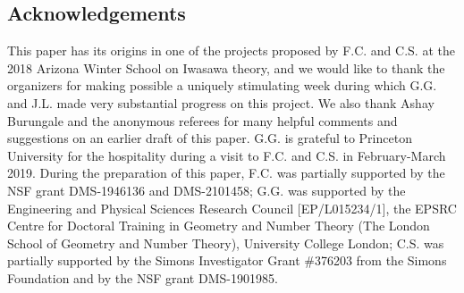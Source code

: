 \subsection{Acknowledgements}
This paper has its origins in one of the projects proposed by F.C. and C.S. at the 2018 Arizona Winter School on Iwasawa theory, and we would like to thank the organizers for making possible a uniquely stimulating week during which G.G. and J.L. made very substantial progress on this project.
{We also thank Ashay Burungale and the anonymous referees for many helpful comments and suggestions on an earlier draft of this paper.}
G.G. is grateful to Princeton University for the hospitality during a visit to F.C. and C.S. in February-March 2019. During the preparation of this paper, F.C. was partially supported by the NSF grant DMS-1946136 and DMS-2101458; G.G. was supported by the Engineering and Physical Sciences Research Council [EP/L015234/1], the EPSRC Centre for Doctoral Training in Geometry and Number Theory (The London School of Geometry and Number Theory), University College London;
C.S. was partially supported by the Simons Investigator Grant \#376203 from the Simons Foundation and by the NSF grant DMS-1901985.
